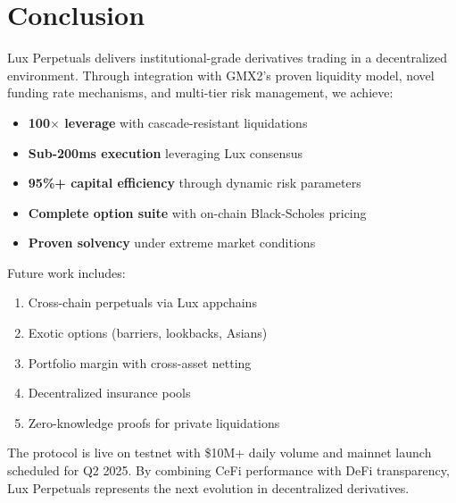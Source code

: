\section{Conclusion}


Lux Perpetuals delivers institutional-grade derivatives trading in a decentralized environment. Through integration with GMX2's proven liquidity model, novel funding rate mechanisms, and multi-tier risk management, we achieve:

\begin{itemize}
    \item \textbf{100$\times$ leverage} with cascade-resistant liquidations
    \item \textbf{Sub-200ms execution} leveraging Lux consensus
    \item \textbf{95\%+ capital efficiency} through dynamic risk parameters
    \item \textbf{Complete option suite} with on-chain Black-Scholes pricing
    \item \textbf{Proven solvency} under extreme market conditions
\end{itemize}

Future work includes:
\begin{enumerate}
    \item Cross-chain perpetuals via Lux appchains
    \item Exotic options (barriers, lookbacks, Asians)
    \item Portfolio margin with cross-asset netting
    \item Decentralized insurance pools
    \item Zero-knowledge proofs for private liquidations
\end{enumerate}

The protocol is live on testnet with \$10M+ daily volume and mainnet launch scheduled for Q2 2025. By combining CeFi performance with DeFi transparency, Lux Perpetuals represents the next evolution in decentralized derivatives.

